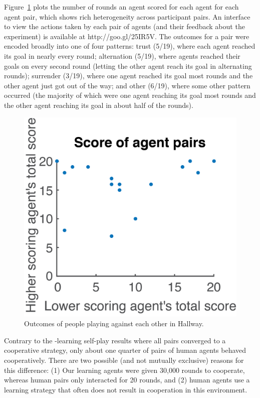 \documentclass[letterpaper]{article}
\begin{document}
Figure~\ref{f:human} plots the number of rounds an agent scored for
each agent for each agent pair, which shows rich heterogeneity across
participant pairs. An interface to view the actions taken by each pair
of agents (and their feedback about the experiment) is available at
http://goo.gl/25IR5V. The outcomes for a pair were encoded broadly
into one of four patterns: trust (5/19), where each agent reached its
goal in nearly every round; alternation (5/19), where agents reached
their goals on every second round (letting the other agent reach its
goal in alternating rounds); surrender (3/19), where one agent reached
its goal most rounds and the other agent just got out of the way; and
other (6/19), where some other pattern occurred (the majority of which
were one agent reaching its goal most rounds and the other agent
reaching its goal in about half of the rounds).

\begin{figure}
\centering
\includegraphics[width=0.8\columnwidth]{figures/agentPairScores4.png}
\caption{Outcomes of people playing against each other in Hallway.}
\label{f:human}
\end{figure}

Contrary to the \Q-learning self-play results where all pairs converged to
a cooperative strategy, only about one quarter of pairs of human
agents behaved cooperatively. There are two possible (and not mutually
exclusive) reasons for this difference: (1) Our learning agents were
given 30,000 rounds to cooperate, whereas human pairs only interacted
for 20 rounds, and (2) human agents use a learning strategy that often
does not result in cooperation in this environment.
\end{document}
